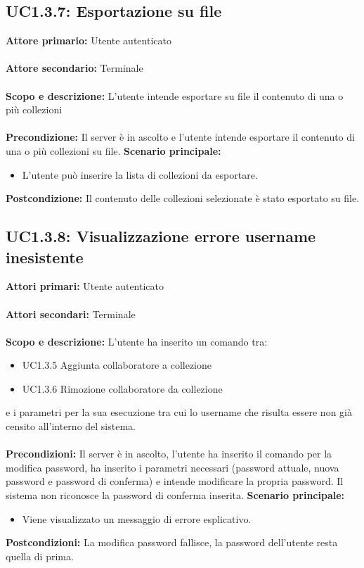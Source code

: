 \documentclass{scalatekids-article}
\begin{document}
\subsection{UC1.3.7: Esportazione su file}

\textbf{Attore primario:} Utente autenticato\\ \\
\textbf{Attore secondario:} Terminale\\ \\
\textbf{Scopo e descrizione:} L'utente intende esportare su file il contenuto di una o più collezioni\\ \\
\textbf{Precondizione:} Il server è in ascolto e l'utente intende esportare il contenuto di una o più collezioni su file.
\textbf{Scenario principale:}
\begin{itemize}
  \item L'utente può inserire la lista di collezioni da esportare. %
\end{itemize}
\textbf{Postcondizione:} Il contenuto delle collezioni selezionate è stato esportato su file.

\subsection{UC1.3.8: Visualizzazione errore username inesistente}

\textbf{Attori primari:} Utente autenticato\\ \\
\textbf{Attori secondari:} Terminale\\ \\
\textbf{Scopo e descrizione:}
L'utente ha inserito un comando tra:
\begin{itemize}
  \item UC1.3.5 Aggiunta collaboratore a collezione
  \item UC1.3.6 Rimozione collaboratore da collezione
\end{itemize}
e i parametri per la sua esecuzione tra cui lo username che risulta essere non già censito all'interno del sistema.\\ \\
\textbf{Precondizioni:} Il server è in ascolto, l'utente ha inserito il %
comando per la modifica password, ha inserito i parametri necessari (password attuale, nuova password e password di conferma) e intende modificare la propria password. Il sistema non riconosce la password di conferma inserita.
\textbf{Scenario principale:}
\begin{itemize}
  \item Viene visualizzato un messaggio di errore esplicativo.
\end{itemize}
\textbf{Postcondizioni:} La modifica password fallisce, la password dell'utente resta quella di prima.
\end{document}
